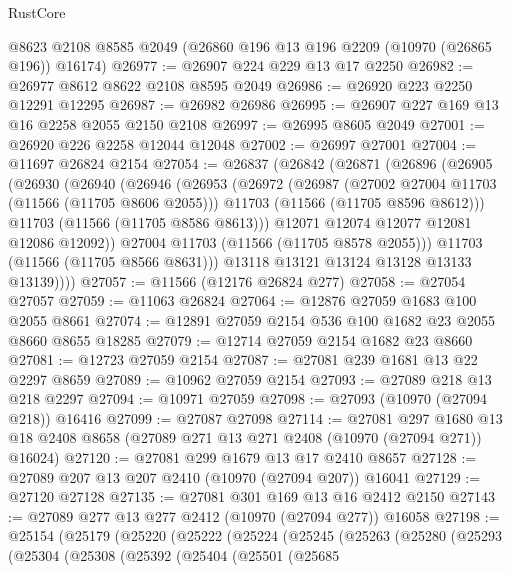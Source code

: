 \begin{lexlean}{RustCore}
\begin{coremodule}
    @8623
    @2108
    @8585
    @2049
    (@26860 @196 @13 @196 @2209 (@10970 (@26865 @196)) @16174)
@26977 := @26907 @224 @229 @13 @17 @2250
@26982 := @26977 @8612 @8622 @2108 @8595 @2049
@26986 := @26920 @223 @2250 @12291 @12295
@26987 := @26982 @26986
@26995 := @26907 @227 @169 @13 @16 @2258 @2055 @2150 @2108
@26997 := @26995 @8605 @2049
@27001 := @26920 @226 @2258 @12044 @12048
@27002 := @26997 @27001
@27004 := @11697 @26824 @2154
@27054 := @26837
    (@26842
      (@26871
        (@26896
          (@26905
            (@26930
              (@26940
                (@26946
                  (@26953
                    (@26972
                      (@26987
                        (@27002 @27004 @11703 (@11566 (@11705 @8606 @2055)))
                        @11703
                        (@11566 (@11705 @8596 @8612)))
                      @11703
                      (@11566 (@11705 @8586 @8613)))
                    @12071
                    @12074
                    @12077
                    @12081
                    @12086
                    @12092))
                @27004
                @11703
                (@11566 (@11705 @8578 @2055)))
              @11703
              (@11566 (@11705 @8566 @8631)))
            @13118
            @13121
            @13124
            @13128
            @13133
            @13139))))
@27057 := @11566 (@12176 @26824 @277)
@27058 := @27054 @27057
@27059 := @11063 @26824
@27064 := @12876 @27059 @1683 @100 @2055 @8661
@27074 := @12891 @27059 @2154 @536 @100 @1682 @23 @2055 @8660 @8655 @18285
@27079 := @12714 @27059 @2154 @1682 @23 @8660
@27081 := @12723 @27059 @2154
@27087 := @27081 @239 @1681 @13 @22 @2297 @8659
@27089 := @10962 @27059 @2154
@27093 := @27089 @218 @13 @218 @2297
@27094 := @10971 @27059
@27098 := @27093 (@10970 (@27094 @218)) @16416
@27099 := @27087 @27098
@27114 := @27081
    @297
    @1680
    @13
    @18
    @2408
    @8658
    (@27089 @271 @13 @271 @2408 (@10970 (@27094 @271)) @16024)
@27120 := @27081 @299 @1679 @13 @17 @2410 @8657
@27128 := @27089 @207 @13 @207 @2410 (@10970 (@27094 @207)) @16041
@27129 := @27120 @27128
@27135 := @27081 @301 @169 @13 @16 @2412 @2150
@27143 := @27089 @277 @13 @277 @2412 (@10970 (@27094 @277)) @16058
@27198 := @25154
    (@25179
      (@25220
        (@25222
          (@25224
            (@25245
              (@25263
                (@25280
                  (@25293
                    (@25304
                      (@25308
                        (@25392
                          (@25404
                            (@25501
                              (@25685

\end{coremodule}
\end{lexlean}
